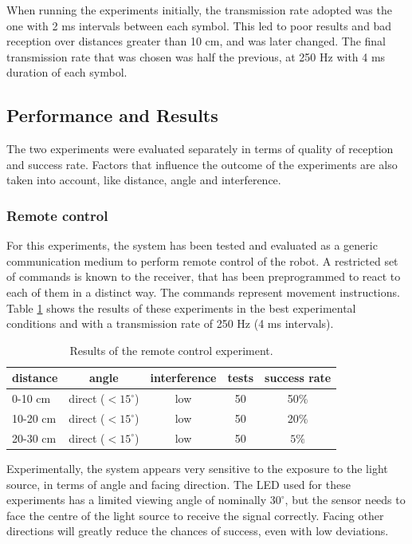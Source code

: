 When running the experiments initially, the transmission rate adopted was the one with 2 ms intervals between each symbol.
This led to poor results and bad reception over distances greater than 10 cm, and was later changed.
The final transmission rate that was chosen was half the previous, at 250 Hz with 4 ms duration of each symbol.

\subsection{Performance and Results}

The two experiments were evaluated separately in terms of quality of reception and success rate.
Factors that influence the outcome of the experiments are also taken into account, like distance, angle and interference.

\subsubsection{Remote control}
For this experiments, the system has been tested and evaluated as a generic communication  medium to perform remote control of the robot.
A restricted set of commands is known to the receiver, that has been preprogrammed to react to each of them in a distinct way.
The commands represent movement instructions.
Table \ref{tab:remotectrl} shows the results of these experiments in the best experimental conditions and with a transmission rate of 250 Hz (4 ms intervals).
\begin{table}[hbt]
\centering
  \begin{tabular}{l c c c c}
    distance & angle & interference & tests & success rate \\
    \hline
   0-10 cm & direct ($< 15^{\circ}$) & low & 50 &  50\%\\
   10-20 cm & direct ($< 15^{\circ}$) & low & 50 & 20\%\\
   20-30 cm & direct ($< 15^{\circ}$) & low & 50 & $5\%$\\
  \end{tabular}
  \caption{Results of the remote control experiment.}
  \label{tab:remotectrl}
\end{table}
Experimentally, the system appears very sensitive to the exposure to the light source, in terms of angle and facing direction.
The LED used for these experiments has a limited viewing angle of nominally $30^{\circ}$, but the sensor needs to face the centre of the light source to receive the signal correctly.
Facing other directions will greatly reduce the chances of success, even with low deviations.

